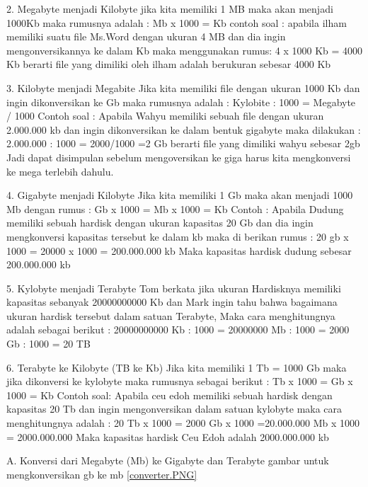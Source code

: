 2. Megabyte menjadi Kilobyte
jika kita memiliki 1 MB maka akan menjadi 1000Kb maka rumusnya adalah :
Mb x 1000 = Kb
contoh soal :
apabila ilham memiliki suatu file Ms.Word dengan ukuran 4 MB dan dia ingin mengonversikannya ke dalam Kb maka menggunakan rumus: 
4 x 1000 Kb = 4000 Kb
berarti file yang dimiliki oleh ilham adalah berukuran sebesar 4000 Kb

3. Kilobyte menjadi Megabite
Jika kita memiliki file dengan ukuran 1000 Kb dan ingin dikonversikan ke Gb maka rumusnya adalah :
Kylobite : 1000 = Megabyte / 1000
Contoh soal :
Apabila Wahyu memiliki sebuah file dengan ukuran 2.000.000 kb dan ingin dikonversikan ke dalam bentuk gigabyte maka dilakukan :
2.000.000 : 1000 = 2000/1000
=2 Gb
berarti file yang dimiliki wahyu sebesar 2gb
Jadi dapat disimpulan sebelum mengoversikan ke giga harus kita mengkonversi ke mega terlebih dahulu.

4.	Gigabyte menjadi Kilobyte
Jika kita memiliki 1 Gb maka akan menjadi 1000 Mb dengan rumus :
Gb x 1000 = Mb x 1000
= Kb
Contoh : 
Apabila Dudung memiliki sebuah hardisk dengan ukuran kapasitas 20 Gb dan dia ingin mengkonversi kapasitas tersebut ke dalam kb maka di berikan rumus :
20 gb x 1000 = 20000 x 1000
= 200.000.000 kb
Maka kapasitas hardisk dudung sebesar 200.000.000 kb

5.	Kylobyte menjadi Terabyte 
Tom berkata jika ukuran Hardisknya memiliki kapasitas sebanyak 20000000000 Kb dan Mark ingin tahu bahwa bagaimana ukuran hardisk tersebut dalam satuan Terabyte, Maka cara menghitungnya adalah sebagai berikut :
20000000000 Kb : 1000 = 20000000 Mb : 1000 = 2000 Gb : 1000 = 20 TB

6.	Terabyte ke Kilobyte (TB ke Kb)
Jika kita memiliki 1 Tb = 1000 Gb maka jika dikonversi ke kylobyte maka rumusnya sebagai berikut :
Tb x 1000 = Gb x 1000 = Kb
Contoh soal:
Apabila ceu edoh memiliki sebuah hardisk dengan kapasitas 20 Tb dan ingin mengonversikan dalam satuan kylobyte maka cara menghitungnya adalah :
20 Tb x 1000 = 2000 Gb x 1000 
=20.000.000 Mb x 1000 = 2000.000.000
Maka kapasitas hardisk Ceu Edoh adalah 2000.000.000 kb

A.	Konversi dari Megabyte (Mb) ke Gigabyte dan Terabyte
gambar untuk mengkonversikan gb ke mb \ref{converter.PNG}

